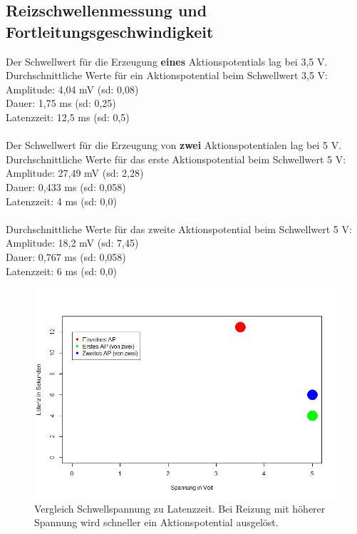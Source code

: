 \documentclass[a4paper]{article}
\begin{document}
\subsection{Reizschwellenmessung und Fortleitungsgeschwindigkeit}
Der Schwellwert für die Erzeugung \textbf{eines} Aktionspotentials lag bei 3,5 V.\\
Durchschnittliche Werte für ein Aktionspotential beim Schwellwert 3,5 V:\\
Amplitude: 4,04 mV (sd: 0,08)\\
Dauer: 1,75 ms (sd: 0,25)\\
Latenzzeit: 12,5 ms (sd: 0,5)\\ \\
Der Schwellwert für die Erzeugung von \textbf{zwei} Aktionspotentialen lag bei 5 V.\\
Durchschnittliche Werte für das erste Aktionspotential beim Schwellwert 5 V:\\
Amplitude: 27,49 mV (sd: 2,28)\\
Dauer: 0,433 ms (sd: 0,058)\\
Latenzzeit: 4 ms (sd: 0,0)\\ \\
Durchschnittliche Werte für das zweite Aktionspotential beim Schwellwert 5 V:\\
Amplitude: 18,2 mV (sd: 7,45)\\
Dauer: 0,767 ms (sd: 0,058)\\
Latenzzeit: 6 ms (sd: 0,0)\\
\begin{figure}[H]
    \centering
        \includegraphics[width=\textwidth]{images/Vergleich_Spannung_Latenz.png}
    \caption{Vergleich Schwellspannung zu Latenzzeit. Bei Reizung mit höherer Spannung wird schneller ein Aktionspotential ausgelöst.}
\end{figure}
\end{document}
